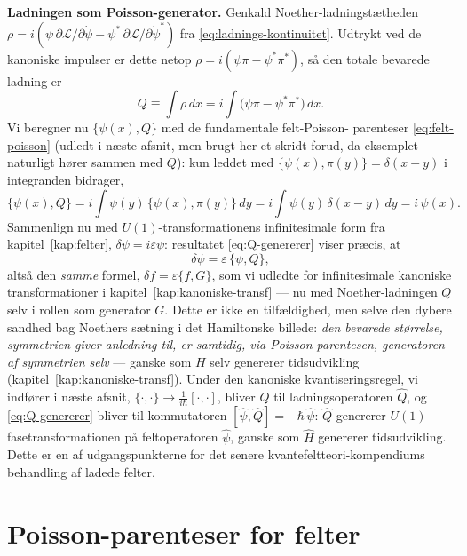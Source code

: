 \begin{eksempel}
\textbf{Ladningen som Poisson-generator.} Genkald Noether-ladningstætheden
$\rho=i(\psi\,\partial\mathcal{L}/\partial\dot\psi-\psi^\ast\,\partial\mathcal{L}/\partial\dot\psi^\ast)$
fra \eqref{eq:ladnings-kontinuitet}. Udtrykt ved de kanoniske impulser
er dette netop $\rho=i(\psi\pi-\psi^\ast\pi^\ast)$, så den totale
bevarede ladning er
\begin{equation}
  Q \equiv \int\rho\,dx = i\int\bigl(\psi\pi-\psi^\ast\pi^\ast\bigr)\,dx.
  \label{eq:Q-kanonisk}
\end{equation}
Vi beregner nu $\{\psi(x),Q\}$ med de fundamentale felt-Poisson-
parenteser \eqref{eq:felt-poisson} (udledt i næste afsnit, men brugt
her et skridt forud, da eksemplet naturligt hører sammen med $Q$):
kun leddet med $\{\psi(x),\pi(y)\}=\delta(x-y)$ i integranden bidrager,
\begin{equation}
  \{\psi(x),Q\} = i\int\psi(y)\,\{\psi(x),\pi(y)\}\,dy
  = i\int\psi(y)\,\delta(x-y)\,dy = i\,\psi(x).
  \label{eq:Q-genererer}
\end{equation}
Sammenlign nu med $U(1)$-transformationens infinitesimale form fra
kapitel~\ref{kap:felter}, $\delta\psi=i\varepsilon\psi$: resultatet
\eqref{eq:Q-genererer} viser præcis, at
\begin{equation}
  \boxed{\delta\psi = \varepsilon\,\{\psi,Q\},}
\end{equation}
altså den \emph{samme} formel, $\delta f=\varepsilon\{f,G\}$, som vi
udledte for infinitesimale kanoniske transformationer i
kapitel~\ref{kap:kanoniske-transf} — nu med Noether-ladningen $Q$
selv i rollen som generator $G$. Dette er ikke en tilfældighed, men
selve den dybere sandhed bag Noethers sætning i det Hamiltonske
billede: \emph{den bevarede størrelse, symmetrien giver anledning
til, er samtidig, via Poisson-parentesen, generatoren af symmetrien
selv} — ganske som $H$ selv genererer tidsudvikling
(kapitel~\ref{kap:kanoniske-transf}). Under den kanoniske
kvantiseringsregel, vi indfører i næste afsnit,
$\{\cdot,\cdot\}\to\frac{1}{i\hbar}[\cdot,\cdot]$, bliver $Q$ til
ladningsoperatoren $\hat Q$, og \eqref{eq:Q-genererer} bliver til
kommutatoren $[\hat\psi,\hat Q]=-\hbar\,\hat\psi$: $\hat Q$ genererer
$U(1)$-fasetransformationen på feltoperatoren $\hat\psi$, ganske som
$\hat H$ genererer tidsudvikling. Dette er en af udgangspunkterne
for det senere kvantefeltteori-kompendiums behandling af ladede
felter.
\end{eksempel}

\section{Poisson-parenteser for felter}

